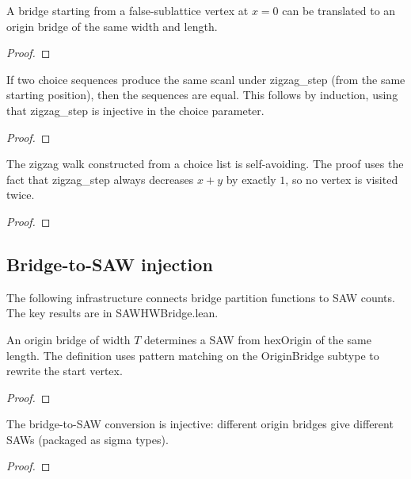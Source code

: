 \begin{lemma}\label{lem:bridge_translate}
\leanok
{}
  A bridge starting from a false-sublattice vertex at $x = 0$ can be
  translated to an origin bridge of the same width and length.
\end{lemma}
\begin{proof}
\leanok
\end{proof}

\begin{lemma}\label{lem:zigzag_scanl_inj}
\leanok
  If two choice sequences produce the same scanl under zigzag\_step
  (from the same starting position), then the sequences are equal.
  This follows by induction, using that zigzag\_step is injective
  in the choice parameter.
\end{lemma}
\begin{proof}
\leanok
\end{proof}

\begin{lemma}\label{lem:zigzag_isPath}
\leanok
  The zigzag walk constructed from a choice list is self-avoiding.
  The proof uses the fact that zigzag\_step always decreases $x + y$
  by exactly $1$, so no vertex is visited twice.
\end{lemma}
\begin{proof}
\leanok
\end{proof}

\subsection{Bridge-to-SAW injection}

The following infrastructure connects bridge partition functions to SAW counts.
The key results are in SAWHWBridge.lean.

\begin{lemma}\label{lem:bridge_to_saw}
\leanok
{}
  An origin bridge of width $T$ determines a SAW from hexOrigin of the
  same length. The definition uses pattern matching on the OriginBridge
  subtype to rewrite the start vertex.
\end{lemma}
\begin{proof}
\leanok
\end{proof}

\begin{lemma}\label{lem:bridge_saw_inj}
\leanok
{}
  The bridge-to-SAW conversion is injective: different origin bridges
  give different SAWs (packaged as sigma types).
\end{lemma}
\begin{proof}
\leanok
{}
\end{proof}

